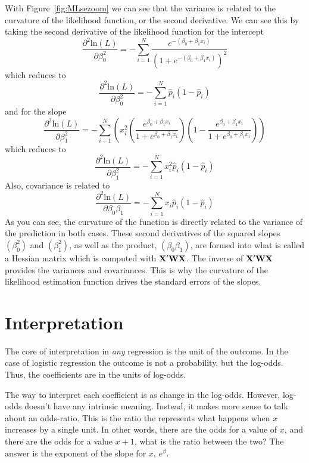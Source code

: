 With Figure~\ref{fig:MLsezoom} we can see that the variance is related to the curvature of the likelihood function, or the second derivative. We can see this by taking the second derivative of the likelihood function for the intercept
\[
\frac{\partial^2\mbox{ln}\left(L\right)}{\partial\beta_0^2}=-\sum_{i=1}^N\frac{e^{-\left(\beta_0+\beta_1x_i\right)}}{\left(1+e^{-\left(\beta_0+\beta_1x_i\right)}\right)^2}
\]
which reduces to
\begin{equation}
\frac{\partial^2\mbox{ln}\left(L\right)}{\partial\beta_0^2}=-\sum_{i=1}^N\hat{p}_i\left(1-\hat{p}_i\right)
\end{equation}
and for the slope
\[
\frac{\partial^2\mbox{ln}\left(L\right)}{\partial\beta_1^2} = -\sum_{i-1}^N\left(x_i^2\left(\frac{e^{\beta_0+\beta_1x_i}}{1+e^{\beta_0+\beta_1x_i}}\right)\left(1-\frac{e^{\beta_0+\beta_1x_i}}{1+e^{\beta_0+\beta_1x_i}}\right)\right)
\]
which reduces to
\begin{equation}
\frac{\partial^2\mbox{ln}\left(L\right)}{\partial\beta_1^2}=-\sum_{i=1}^Nx_i^2\hat{p}_i\left(1-\hat{p}_i\right)
\end{equation}
Also, covariance is related to
\begin{equation}
\frac{\partial^2\mbox{ln}\left(L\right)}{\partial\beta_0\beta_1}=-\sum_{i=1}^Nx_i\hat{p}_i\left(1-\hat{p}_i\right)
\end{equation}
As you can see, the curvature of the function is directly related to the variance of the prediction in both cases. These second derivatives of the squared slopes $(\beta_0^2)$ and $(\beta_1^2)$, as well as the product, $(\beta_0\beta_1)$, are formed into what is called a Hessian matrix which is computed with ${\bf{X'WX}}$.
The inverse of ${\bf{X'WX}}$ provides the variances and covariances. This is why the curvature of the likelihood estimation function drives the standard errors of the slopes.

\section{Interpretation}

The core of interpretation in {\it any} regression is the unit of the outcome. In the case of logistic regression the outcome is not a probability, but the log-odds. Thus, the coefficients are in the units of log-odds.

The way to interpret each coefficient is as change in the log-odds. However, log-odds doesn’t have any intrinsic meaning. Instead, it makes more sense to talk about an odds-ratio. This is the ratio the represents what happens when $x$ increases by a single unit. In other words, there are the odds for a value of $x$, and there are the odds for a value $x+1$, what is the ratio between the two? The answer is the exponent of the slope for $x$, $e^{\beta}$.

